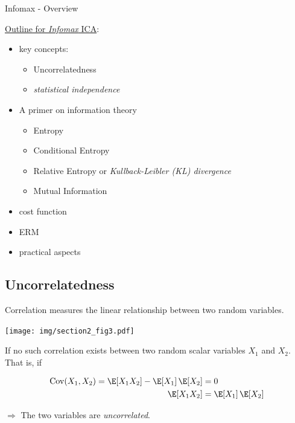 \begin{frame}{Infomax - Overview}


\clearpage

\underline{Outline for \emph{Infomax} ICA}:
\begin{itemize}
	\item {}key concepts:
    \begin{itemize}
		\item Uncorrelatedness
		\item \emph{statistical independence}
    \end{itemize}
    \item A primer on information theory
    \begin{itemize}
        \item Entropy
        \item Conditional Entropy
        \item Relative Entropy or \emph{Kullback-Leibler (KL) divergence}
        \item Mutual Information
    \end{itemize}
    \item cost function
    \item ERM
    \item practical aspects
\end{itemize}

\end{frame}

\subsection{Uncorrelatedness}

\begin{frame}{\subsecname}

Correlation measures the linear relationship between two random variables.
\begin{center}
\texttt{[image: img/section2\_fig3.pdf]}
\end{center}

If no such correlation exists between two random scalar variables $X_1$ and $X_2$. That is, if

\svspace{-3mm}

\begin{align}
\label{eq:uncorr}
\mathrm{Cov}(X_1, X_2) = \E  \lbrack X_1  X_2 \rbrack - \E  \lbrack X_1 \rbrack \, \E \lbrack X_2 \rbrack  &= 0\\
\E  \lbrack X_1  X_2 \rbrack &= \E  \lbrack X_1 \rbrack \, \E \lbrack X_2 \rbrack
\end{align}

$\Rightarrow$ The two variables are \emph{uncorrelated}.

\end{frame}

